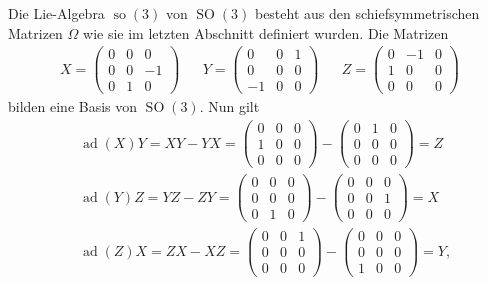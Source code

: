 \documentclass[paper=A4, twoside, chapterprefix=true, bibliography=totoc, headsepline]{scrbook}
\DeclareMathOperator{\ad}{ad}
\DeclareMathOperator{\so}{so}
\DeclareMathOperator{\SO}{SO} %
\theoremstyle{nonumberbreak}
\theoremstyle{emptybreak}
\theoremstyle{break}
\begin{document}
Die Lie-Algebra $\so(3)$ von $\SO(3)$ besteht aus den schiefsymmetrischen Matrizen $\Omega$ wie sie im letzten Abschnitt definiert wurden.
Die Matrizen
\begin{align*}
	X =
	\begin{pmatrix}
		0 & 0 & 0 \\
		0 & 0 & -1 \\
		0 & 1 & 0
	\end{pmatrix}
	&&
	Y=
	\begin{pmatrix}
		0 & 0 & 1 \\
		0 & 0 & 0 \\
		-1 & 0 & 0
	\end{pmatrix}
	&&
	Z=
	\begin{pmatrix}
		0 & -1 & 0 \\
		1 & 0 & 0 \\
		0 & 0 & 0
	\end{pmatrix}
\end{align*}
bilden eine Basis von $\SO(3)$.
Nun gilt
\begin{align*}
	&\ad(X) Y = XY - YX =
	\begin{pmatrix}
		0 & 0 & 0 \\
		1 & 0 & 0 \\
		0 & 0 & 0
	\end{pmatrix}
	-
	\begin{pmatrix}
		0 & 1 & 0 \\
		0 & 0 & 0 \\
		0 & 0 & 0
	\end{pmatrix}
	= Z
	\\
	&\ad(Y) Z = YZ - ZY =
	\begin{pmatrix}
		0 & 0 & 0 \\
		0 & 0 & 0 \\
		0 & 1 & 0
	\end{pmatrix}
	-
	\begin{pmatrix}
		0 & 0 & 0 \\
		0 & 0 & 1 \\
		0 & 0 & 0
	\end{pmatrix}
	= X
	\\
	&\ad(Z) X = ZX - XZ =
	\begin{pmatrix}
		0 & 0 & 1 \\
		0 & 0 & 0 \\
		0 & 0 & 0
	\end{pmatrix}
	-
	\begin{pmatrix}
		0 & 0 & 0 \\
		0 & 0 & 0 \\
		1 & 0 & 0
	\end{pmatrix}
	= Y,
\end{align*}
\end{document}

